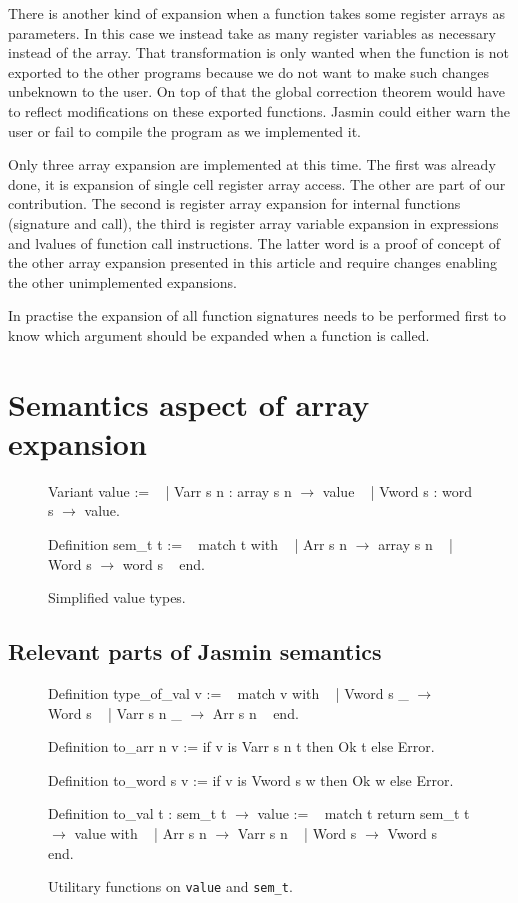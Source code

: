 \documentclass{article}
\begin{document}
There is another kind of expansion when a function takes some register arrays as
parameters. In this case we instead take as many register variables as necessary
instead of the array. That transformation is only wanted when the function is
not exported to the other programs because we do not want to make such changes
unbeknown to the user. On top of that the global correction theorem would have
to reflect modifications on these exported functions. Jasmin could either warn
the user or fail to compile the program as we implemented it.

Only three array expansion are implemented at this time. The first was already
done, it is expansion of single cell register array access. The other are part
of our contribution. The second is register array expansion for internal
functions (signature and call), the third is register array variable expansion
in expressions and lvalues of function call instructions. The latter word is
a proof of concept of the other array expansion presented in this article and
require changes enabling the other unimplemented expansions.

In practise the expansion of all function signatures needs to be performed first
to know which argument should be expanded when a function is called.


\section{Semantics aspect of array expansion}\label{sec:semantics}

\begin{figure}[t]
\obeylines\obeyspaces\ttfamily%
Variant value :=
~ | Varr s n : array s n \(\rightarrow\) value
~ | Vword s  : word  s   \(\rightarrow\) value.

Definition sem\_t t :=
~ match t with
~ | Arr s n \(\rightarrow\) array s n
~ | Word s  \(\rightarrow\) word  s
~ end.
\normalfont%
\caption{Simplified value types.}\label{fig:val}
\end{figure}

\subsection{Relevant parts of Jasmin semantics}

\begin{figure}[t]
\obeylines\obeyspaces\ttfamily%
Definition type\_of\_val v :=
~ match v with
~ | Vword s  \_ \(\rightarrow\) Word s
~ | Varr s n \_ \(\rightarrow\) Arr s n
~ end.

Definition to\_arr  n v := if v is Varr s n t then Ok t else Error.

Definition to\_word s v := if v is Vword s  w then Ok w else Error.

Definition to\_val t : sem\_t t \(\rightarrow\) value :=
~ match t return sem\_t t \(\rightarrow\) value with
~ | Arr s n \(\rightarrow\) Varr s n
~ | Word s  \(\rightarrow\) Vword s
~ end.
\normalfont%
\caption{Utilitary functions on \texttt{value} and \texttt{sem\_t}.}
\end{figure}
\end{document}
